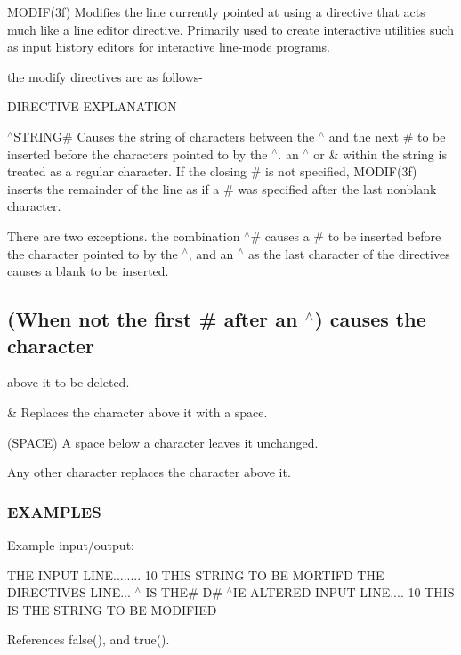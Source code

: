 M\+O\+D\+I\+F(3f) Modifies the line currently pointed at using a directive that acts much like a line editor directive. Primarily used to create interactive utilities such as input history editors for interactive line-\/mode programs.

the modify directives are as follows-\/

D\+I\+R\+E\+C\+T\+I\+VE E\+X\+P\+L\+A\+N\+A\+T\+I\+ON

$^\wedge$\+S\+T\+R\+I\+NG\# Causes the string of characters between the $^\wedge$ and the next \# to be inserted before the characters pointed to by the $^\wedge$. an $^\wedge$ or \& within the string is treated as a regular character. If the closing \# is not specified, M\+O\+D\+I\+F(3f) inserts the remainder of the line as if a \# was specified after the last nonblank character.

There are two exceptions. the combination $^\wedge$\# causes a \# to be inserted before the character pointed to by the $^\wedge$, and an $^\wedge$ as the last character of the directives causes a blank to be inserted.

\subsection*{(When not the first \# after an $^\wedge$) causes the character}

above it to be deleted.

\& Replaces the character above it with a space.

(S\+P\+A\+CE) A space below a character leaves it unchanged.

Any other character replaces the character above it.

\subsubsection*{E\+X\+A\+M\+P\+L\+ES}

Example input/output\+:

T\+HE I\+N\+P\+UT L\+I\+NE........ 10 T\+H\+IS S\+T\+R\+I\+NG TO BE M\+O\+R\+T\+I\+FD T\+HE D\+I\+R\+E\+C\+T\+I\+V\+ES L\+I\+NE... $^\wedge$ IS T\+HE\# D\# $^\wedge$\+IE A\+L\+T\+E\+R\+ED I\+N\+P\+UT L\+I\+NE.... 10 T\+H\+IS IS T\+HE S\+T\+R\+I\+NG TO BE M\+O\+D\+I\+F\+I\+ED 

References false(), and true().

\mbox{\label{namespacem__strings_a5d72fde097444c689f1822c5ad95e03d}} 
